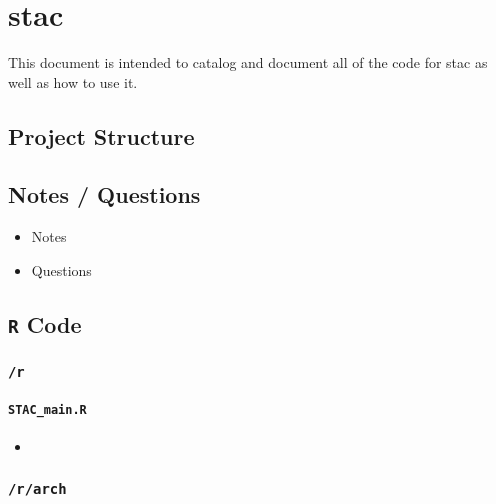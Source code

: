 \documentclass[
]{book}
\providecommand{\tightlist}{%
  \setlength{\itemsep}{0pt}\setlength{\parskip}{0pt}}
\begin{document}
\hypertarget{stac}{%
\chapter{stac}\label{stac}}

This document is intended to catalog and document all of the code for stac as well as how to use it.

\hypertarget{project-structure-3}{%
\section{Project Structure}\label{project-structure-3}}

\hypertarget{notes-questions-3}{%
\section{Notes / Questions}\label{notes-questions-3}}

\begin{itemize}
\tightlist
\item
  Notes
\item
  Questions
\end{itemize}

\hypertarget{r-code-3}{%
\section{\texorpdfstring{\texttt{R} Code}{R Code}}\label{r-code-3}}

\hypertarget{r-3}{%
\subsection{\texorpdfstring{\texttt{/r}}{/r}}\label{r-3}}

\hypertarget{stac_main.r}{%
\subsubsection{\texorpdfstring{\texttt{STAC\_main.R}}{STAC\_main.R}}\label{stac_main.r}}

\begin{itemize}
\item
\end{itemize}

\hypertarget{rarch-1}{%
\subsection{\texorpdfstring{\texttt{/r/arch}}{/r/arch}}\label{rarch-1}}
\end{document}
